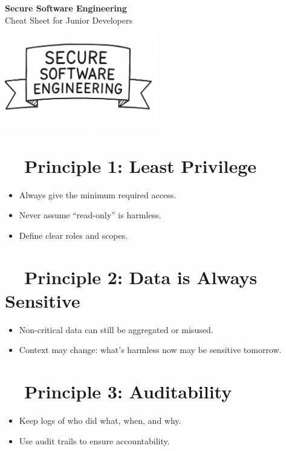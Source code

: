 \documentclass[a4paper,10pt]{article}
\begin{document}
\begin{center}
    {\Huge \textbf{Secure Software Engineering}}\\[0.5em]
    \Large Cheat Sheet for Junior Developers\\[1em]
    \includegraphics[width=0.5\textwidth]{security_banner.png}
\end{center}

\vspace{1em}

\section*{\faUserShield\ \ Principle 1: Least Privilege}
\begin{tcolorbox}[colback=lightgray, colframe=accentblue, title=Key Ideas]
\begin{itemize}
    \item Always give the minimum required access.
    \item Never assume “read-only” is harmless.
    \item Define clear roles and scopes.
\end{itemize}
\end{tcolorbox}

\section*{\faLock\ \ Principle 2: Data is Always Sensitive}
\begin{tcolorbox}[colback=lightgray, colframe=accentblue, title=Key Ideas]
\begin{itemize}
    \item Non-critical data can still be aggregated or misused.
    \item Context may change: what’s harmless now may be sensitive tomorrow.
\end{itemize}
\end{tcolorbox}

\section*{\faClipboardList\ \ Principle 3: Auditability}
\begin{tcolorbox}[colback=lightgray, colframe=accentblue, title=Key Ideas]
\begin{itemize}
    \item Keep logs of who did what, when, and why.
    \item Use audit trails to ensure accountability.
\end{itemize}
\end{tcolorbox}
\end{document}
